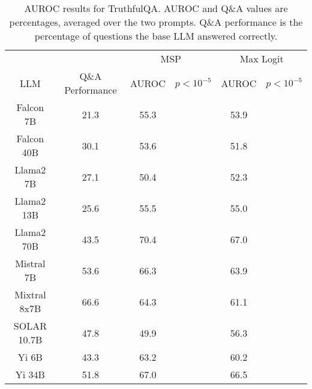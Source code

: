 \begin{table*}
\centering
\begin{tabular}{c|c|c|c|c|c}
& & \multicolumn{2}{c|}{MSP} & \multicolumn{2}{c}{Max Logit} \\ 
LLM & Q\&A Performance & AUROC & $p < 10^{-5}$ & AUROC & $p < 10^{-5}$\\ \hline
Falcon 7B & 21.3 & 55.3 &  & 53.9 & \\
Falcon 40B & 30.1 & 53.6 &  & 51.8 & \\
Llama2 7B & 27.1 & 50.4 &  & 52.3 & \\
Llama2 13B & 25.6 & 55.5 &  & 55.0 & \\
Llama2 70B & 43.5 & 70.4 &  & 67.0 & \\
Mistral 7B & 53.6 & 66.3 &  & 63.9 & \\
Mixtral 8x7B & 66.6 & 64.3 &  & 61.1 & \\
SOLAR 10.7B & 47.8 & 49.9 &  & 56.3 & \\
Yi 6B & 43.3 & 63.2 &  & 60.2 & \\
Yi 34B & 51.8 & 67.0 &  & 66.5 & \\
\hline
\end{tabular}
\caption{AUROC results for TruthfulQA. AUROC and Q\&A values are percentages, averaged over the two prompts. Q\&A performance is the percentage of questions the base LLM answered correctly.}
\label{tab:truthfulqa_auroc}
\end{table*}
